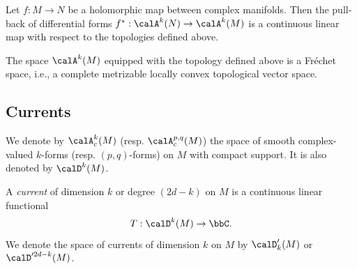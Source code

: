 \begin{proposition}\label{prop:pullback_of_forms_is_continuous}
	Let \(f: M \to N\) be a holomorphic map between complex manifolds.
	Then the pull-back of differential forms \(f^*: \calA^{k}(N) \to \calA^{k}(M)\) is a continuous linear map with respect to the topologies defined above.
\end{proposition}

\begin{proposition}\label{prop:A^k_is_Frechet_space}
	The space \(\calA^{k}(M)\) equipped with the topology defined above is a Fr\'echet space,
	i.e., a complete metrizable locally convex topological vector space.
\end{proposition}


\subsection{Currents}

We denote by \(\calA_c^{k}(M)\) (resp. \(\calA_c^{p,q}(M)\)) the space of smooth complex-valued \(k\)-forms (resp. \((p,q)\)-forms) on \(M\) with compact support.
It is also denoted by \(\calD^{k}(M)\).

\begin{definition}\label{def:currents}
	A \emph{current} of dimension \(k\) or degree \((2d - k)\) on \(M\) is a continuous linear functional
	\[ T: \calD^k(M) \to \bbC. \]
	We denote the space of currents of dimension \(k\) on \(M\) by \(\calD_k'(M)\) or \(\calD'^{2d-k}(M)\).
\end{definition}

